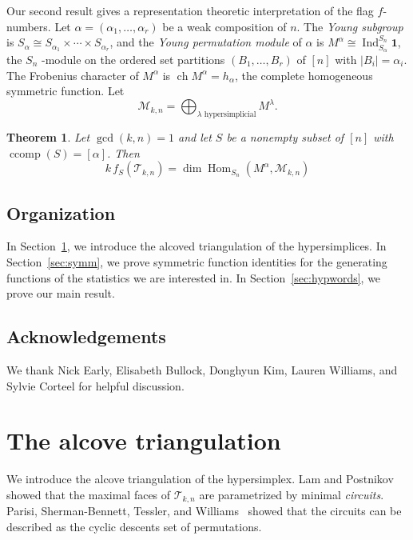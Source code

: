\documentclass[10pt,a4paper]{amsart}
\theoremstyle{plain}
\newtheorem{theorem}{Theorem}[section]
\theoremstyle{definition}
\newcommand{\M}{\mathcal{M}}
\newcommand{\Tri}{\mathcal{T}_{k,n}}
\newcommand{\triv}{\mathbf{1}}
\DeclareMathOperator{\ccomp}{ccomp}
\DeclareMathOperator{\Ind}{Ind}
\DeclareMathOperator{\Hom}{Hom}
\DeclareMathOperator{\ch}{ch}
\begin{document}
Our second result gives a representation theoretic interpretation of the flag $ f $-numbers. Let $ \alpha =
(\alpha_1,\dots,\alpha_r) $ be a weak composition of $ n $. The \emph{Young subgroup} is $ S_\alpha \cong S_{\alpha_1}
\times \cdots \times S_{\alpha_r} $, and the \emph{Young permutation module} of $\alpha$ is $ M^\alpha \cong
\Ind_{S_\alpha}^{S_n} \triv $, the $ S_n $ -module on the ordered set partitions $ (B_1,\dots,B_r) $ of $ [n] $ with $
|B_i| = \alpha_i $. The Frobenius character of $ M^\alpha $ is $ \ch M^{\alpha} = h_\alpha $, the complete homogeneous
symmetric function. Let
\begin{equation}
	\label{eq:Mkn} \M_{k,n} = \bigoplus_{\lambda \text{ hypersimplicial}} M^\lambda.
\end{equation}

\begin{theorem}\label{thm:repmain}
	Let $ \gcd(k,n)=1 $ and let $ S $
	be a nonempty subset of $ [n] $ with $\ccomp(S) = [\alpha]$. Then
	\begin{equation}
		k \, f_S(\Tri) = \dim \Hom_{S_n}(M^{\alpha}, \M_{k,n})
	\end{equation}
\end{theorem}


\subsection*{Organization}
In Section~\ref{sec:triangulation}, we introduce the alcoved triangulation of the hypersimplices. In
Section~\ref{sec:symm}, we prove symmetric function identities for the generating functions of the statistics we are
interested in. In Section~\ref{sec:hypwords}, we prove our main result.
\subsection*{Acknowledgements}
We thank Nick Early, Elisabeth Bullock, Donghyun Kim, Lauren Williams, and Sylvie Corteel for helpful discussion.


\section{The alcove triangulation}\label{sec:triangulation}

We introduce the alcove triangulation of the hypersimplex. Lam and Postnikov~\cite{alcove1} showed that the maximal
faces of $ \Tri $ are parametrized by minimal \emph{circuits}. Parisi, Sherman-Bennett, Tessler, and
Williams~\cite{magicnumber} showed that the circuits can be described as the cyclic descents set of permutations.
\end{document}
